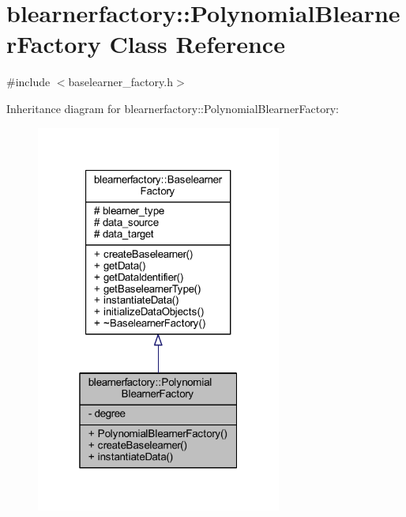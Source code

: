 \hypertarget{classblearnerfactory_1_1_polynomial_blearner_factory}{}\section{blearnerfactory\+:\+:Polynomial\+Blearner\+Factory Class Reference}
\label{classblearnerfactory_1_1_polynomial_blearner_factory}


{\ttfamily \#include $<$baselearner\+\_\+factory.\+h$>$}



Inheritance diagram for blearnerfactory\+:\+:Polynomial\+Blearner\+Factory\+:\nopagebreak
\begin{figure}[H]
\begin{center}
\leavevmode
\includegraphics[width=229pt]{classblearnerfactory_1_1_polynomial_blearner_factory__inherit__graph}
\end{center}
\end{figure}


